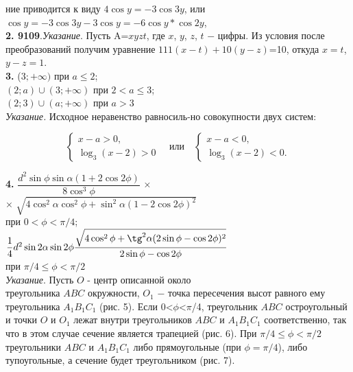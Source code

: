 
\begin{multicols}{2}
 ние приводится к виду $4\cos y=-3\cos 3y$, или $\cos y = -3\cos 3y - 3 \cos y = -6\cos y * \cos 2y$, \\ \textbf{2. 9109}.\textit{Указание}. Пусть A=$xyzt$, где $x$, $y$, $z$, $t$ $-$ цифры. Из условия после преобразований получим уравнение $111(x-t)+10(y-z)$=10, откуда $x=t$, $y-z=1$.\\
\textbf{3.} ($3;+\infty)$ при $a\leq 2$;\\
$(2; a) \cup (3;+\infty)$ при $2<a\leq 3$;\\
$(2;3) \cup (a; +\infty)$ при $a>3$\\
\textit{Указание.} Исходное неравенство равносиль-\linebreak но совокупности двух систем:\\
\begin{fleqn}
\begin{equation*}
	\left\{
		\begin{array}{lcl}
		x-a>0,\\
		\log_{3}(x-2)>0
		\end{array}
	\right.
	\quad\text{или}\quad
	\left\{
		\begin{array}{lcl}
		x-a<0,\\
		\log_{3}(x-2)<0.
		\end{array}
	\right.
\end{equation*}
\end{fleqn}
\textbf{4.}
\large{$\dfrac{d^{2} \sin\phi \sin\alpha (1+2\cos 2\phi)}{8\cos^{3}\phi}$}
\large{×}\\ \large{×} \large{$\sqrt{4 \cos^{2}\alpha  \cos^{2}\phi + \sin^{2}\alpha (1-2\cos 2\phi)^{2}}$}\\
при $0 < \phi < \pi / 4$;\\
\large{$\dfrac{1}{4}d^{2}\sin 2\alpha \sin 2\phi \dfrac{\sqrt{4\cos^{2}\phi+\tg^{2}\alpha(2\sin \phi - \cos 2\phi)^{2}}}{2\sin\phi-\cos 2\phi}$}\\
\normalsize{при $\pi /4 \leq \phi < \pi /2$}\\
\textit{Указание}. Пусть $O$ - центр описанной около\\ треугольника $ABC$ окружности, $O_{1}$ $-$ точка пересечения
высот равного ему треугольника $A_{1}B_{1}C_{1}$ (рис. 5). Если 0<$\phi$<$\pi$/4, треугольник
$ABC$ остроугольный и точки $O$ и $O_{1}$ лежат внутри треугольников $ABC$ и $A_{1}B_{1}C_{1}$ соответственно, так что в этом случае сечение является трапецией (рис. 6). При $\pi/4\leq\phi<\pi/2$ треугольники $ABC$ и $A_{1}B_{1}C_{1}$
либо прямоугольные (при $\phi=\pi/4$), либо тупоугольные, а сечение будет треугольником (рис. 7).\\

\end{multicols}
